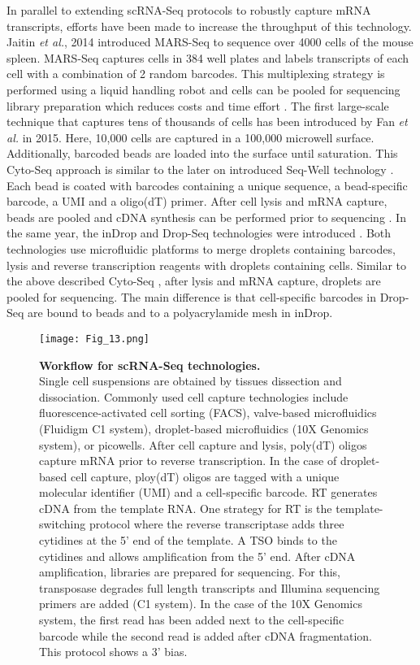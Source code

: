 In parallel to extending scRNA-Seq protocols to robustly capture mRNA transcripts, efforts have been made to increase the throughput of this technology. Jaitin \emph{et al.}, 2014 introduced \gls{MARS-Seq} to sequence over 4000 cells of the mouse spleen. MARS-Seq captures cells in 384 well plates and labels transcripts of each cell with a combination of 2 random barcodes. This multiplexing strategy is performed using a liquid handling robot and cells can be pooled for sequencing library preparation which reduces costs and time effort \citep{Jaitin2014}. The first large-scale technique that captures tens of thousands of cells has been introduced by Fan \emph{et al.} in 2015. Here, 10,000 cells are captured in a 100,000 microwell surface. Additionally, barcoded beads are loaded into the surface until saturation. This Cyto-Seq approach is similar to the later on introduced Seq-Well technology \citep{Gierahn2017}. Each bead is coated with barcodes containing a unique sequence, a bead-specific barcode, a UMI and a oligo(dT) primer. After cell lysis and mRNA capture, beads are pooled and cDNA synthesis can be performed prior to sequencing \citep{Fan2015}. In the same year, the inDrop and Drop-Seq technologies were introduced \citep{Klein2015, Macosko2015}. Both technologies use microfluidic platforms to merge droplets containing barcodes, lysis and reverse transcription reagents with droplets containing cells. Similar to the above described Cyto-Seq \citep{Fan2015}, after lysis and mRNA capture, droplets are pooled for sequencing. The main difference is that cell-specific barcodes in Drop-Seq are bound to beads and to a polyacrylamide mesh in inDrop.  \\ 

\begin{figure}[!h]
\centering
\texttt{[image: Fig\_13.png]}
\caption[Workflow for scRNA-Seq technologies]{\textbf{Workflow for scRNA-Seq technologies.}\\
Single cell suspensions are obtained by tissues dissection and dissociation. Commonly used cell capture technologies include fluorescence-activated cell sorting (FACS), valve-based microfluidics (Fluidigm\textsuperscript{\textregistered{}} C1 system), droplet-based microfluidics (10X Genomics\textsuperscript{\textregistered{}} system), or picowells. After cell capture and lysis, poly(dT) oligos capture mRNA prior to reverse transcription. In the case of droplet-based cell capture, ploy(dT) oligos are tagged with a unique molecular identifier (UMI) and a cell-specific barcode. \Gls{RT} generates cDNA from the template RNA. One strategy for RT is the template-switching protocol where the reverse transcriptase adds three cytidines at the 5' end of the template. A \gls{TSO} binds to the cytidines and allows amplification from the 5' end. After cDNA amplification, libraries are prepared for sequencing. For this, transposase degrades full length transcripts and Illumina sequencing primers are added (C1 system). In the case of the 10X Genomics system, the first read has been added next to the cell-specific barcode while the second read is added after cDNA fragmentation. This protocol shows a 3' bias.}
\label{fig0:scRNA-Seq}
\end{figure}


